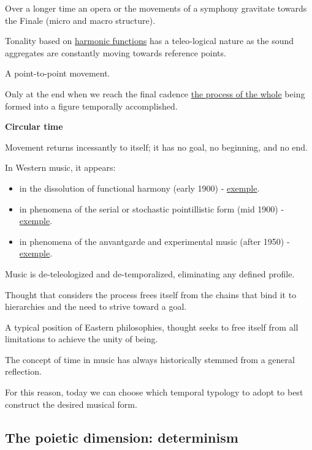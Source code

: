 Over a longer time an opera or the movements of a symphony gravitate towards the Finale (micro and macro structure).

Tonality based on \href{http://www.musicaecodice.it/gitmedia/emc/3_media/aggregati.mp3}{harmonic functions} has a teleo-logical nature as the sound aggregates are constantly moving towards reference points.

A point-to-point movement.

Only at the end when we reach the final cadence \href{http://www.musicaecodice.it/gitmedia/emc/3_media/forma1.m4v}{the process of the whole} being formed into a figure temporally accomplished.

\textbf{Circular time}\label{circular-time}

Movement returns incessantly to itself; it has no goal, no beginning, and no end.

In Western music, it appears:

\begin{itemize}
\tightlist
\item in the dissolution of functional harmony (early 1900) - \href{http://www.musicaecodice.it/gitmedia/emc/3_media/mal.mp3}{exemple}.
\item in phenomena of the serial or stochastic pointillistic form (mid 1900) - \href{http://www.musicaecodice.it/gitmedia/emc/3_media/web.mp3}{exemple}.
\item in phenomena of the anvantgarde and experimental music (after 1950) - \href{http://www.musicaecodice.it/gitmedia/emc/3_media/mont.mp3}{exemple}.
\end{itemize}

Music is de-teleologized and de-temporalized, eliminating any defined profile.

Thought that considers the process frees itself from the chains that bind it to hierarchies and the need to strive toward a goal.

A typical position of Eastern philosophies, thought seeks to free itself from all limitations to achieve the unity of being.

The concept of time in music has always historically stemmed from a general reflection.

For this reason, today we can choose which temporal typology to adopt to best construct the desired musical form.

\subsection{The poietic dimension: determinism}\label{the-poietic-dimension-determinism}

